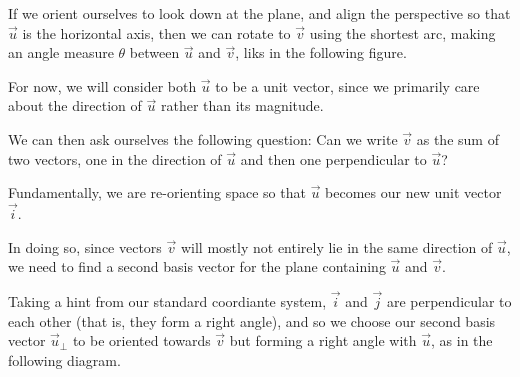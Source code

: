 \documentclass{ximera}
\begin{document}
    If we orient ourselves to look down at the plane, and align the perspective so that $\vec{u}$ is the horizontal axis, then we can rotate to $\vec{v}$ using the shortest arc, making an angle measure $\theta$ between $\vec{u}$ and $\vec{v}$, liks in the following figure.

    \begin{center}
      \end{center}

   For now, we will consider both $\vec{u}$ to be a unit vector, since we primarily care about the direction of $\vec{u}$ rather than its magnitude. 

   We can then ask ourselves the following question: Can we write $\vec{v}$ as the sum of two vectors, one in the direction of $\vec{u}$ and then one perpendicular to $\vec{u}$?

   Fundamentally, we are re-orienting space so that $\vec{u}$ becomes our new unit vector $\vec{i}$.

   In doing so, since vectors $\vec{v}$ will mostly not entirely lie in the same direction of $\vec{u}$, we need to find a second basis vector for the plane containing $\vec{u}$ and $\vec{v}$. 

   Taking a hint from our standard coordiante system, $\vec{i}$ and $\vec{j}$ are perpendicular to each other (that is, they form a right angle), and so we choose our second basis vector $\vec{u}_\perp$ to be oriented towards $\vec{v}$ but forming a right angle with $\vec{u}$, as in the following diagram.
     
    \begin{center}
     
    \end{center}
\end{document}
